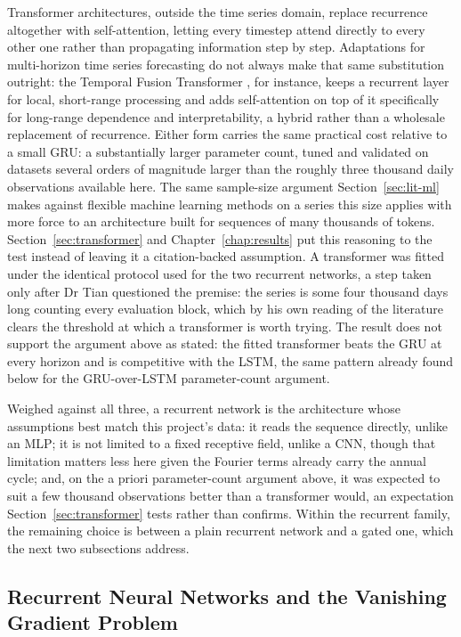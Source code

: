 \documentclass[12pt,a4paper]{report}
\begin{document}
Transformer architectures, outside the time series domain, replace
recurrence altogether with self-attention, letting every timestep attend
directly to every other one rather than propagating information step by
step. Adaptations for multi-horizon time series forecasting do not always
make that same substitution outright: the Temporal Fusion Transformer
\citep{lim2021tft}, for instance, keeps a recurrent layer for local,
short-range processing and adds self-attention on top of it specifically
for long-range dependence and interpretability, a hybrid rather than a
wholesale replacement of recurrence. Either form carries the same
practical cost relative to a small GRU: a substantially larger parameter
count, tuned and validated on datasets several orders of magnitude larger
than the roughly three thousand daily observations available here. The
same sample-size argument Section~\ref{sec:lit-ml} makes against flexible
machine learning methods on a series this size applies with more force to
an architecture built for sequences of many thousands of tokens.
Section~\ref{sec:transformer} and Chapter~\ref{chap:results} put this
reasoning to the test instead of leaving it a citation-backed assumption.
A transformer was fitted under the identical protocol used for the two
recurrent networks, a step taken only after Dr Tian questioned the premise:
the series is some four thousand days long counting every evaluation block,
which by his own reading of the literature clears the threshold at which a
transformer is worth trying. The result does not support the argument above
as stated: the fitted transformer beats the GRU at every horizon and is
competitive with the LSTM, the same pattern already found below for the
GRU-over-LSTM parameter-count argument.

Weighed against all three, a recurrent network is the architecture whose
assumptions best match this project's data: it reads the sequence directly,
unlike an MLP; it is not limited to a fixed receptive field, unlike a CNN,
though that limitation matters less here given the Fourier terms already
carry the annual cycle; and, on the a priori parameter-count argument above,
it was expected to suit a few thousand observations better than a
transformer would, an expectation Section~\ref{sec:transformer} tests rather
than confirms. Within the recurrent family, the remaining choice is between
a plain recurrent network and a gated one, which the next two subsections
address.

\subsection{Recurrent Neural Networks and the Vanishing Gradient Problem}
\end{document}
